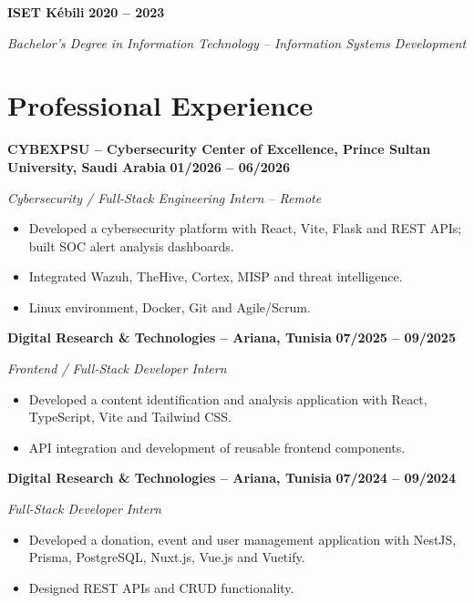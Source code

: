 \documentclass[10pt,a4paper]{article}
\begin{document}
\textbf{ISET Kébili}
\hfill \textbf{2020 -- 2023}

\textit{Bachelor's Degree in Information Technology -- Information Systems Development}



\section*{Professional Experience}

\textbf{CYBEXPSU -- Cybersecurity Center of Excellence, Prince Sultan University,
Saudi Arabia}
\hfill \textbf{01/2026 -- 06/2026}

\textit{Cybersecurity / Full-Stack Engineering Intern -- Remote}

\begin{itemize}
    \item Developed a cybersecurity platform with React, Vite, Flask and REST
    APIs; built SOC alert analysis dashboards.
    \item Integrated Wazuh, TheHive, Cortex, MISP and threat intelligence.
    \item Linux environment, Docker, Git and Agile/Scrum.
\end{itemize}

\textbf{Digital Research \& Technologies -- Ariana, Tunisia}
\hfill \textbf{07/2025 -- 09/2025}

\textit{Frontend / Full-Stack Developer Intern}

\begin{itemize}
    \item Developed a content identification and analysis application with
    React, TypeScript, Vite and Tailwind CSS.
    \item API integration and development of reusable frontend components.
\end{itemize}

\textbf{Digital Research \& Technologies -- Ariana, Tunisia}
\hfill \textbf{07/2024 -- 09/2024}

\textit{Full-Stack Developer Intern}

\begin{itemize}
    \item Developed a donation, event and user management application with
    NestJS, Prisma, PostgreSQL, Nuxt.js, Vue.js and Vuetify.
    \item Designed REST APIs and CRUD functionality.
\end{itemize}
\end{document}
